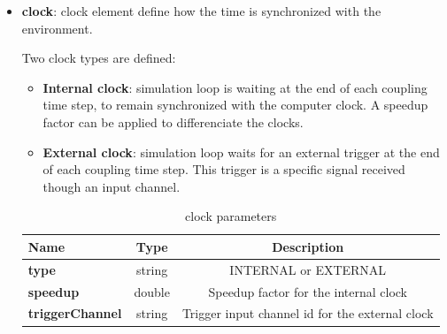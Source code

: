 \documentclass[a4paper, 12pt]{report}
\begin{document}
\begin{itemize}
\begin{itemize}
  \item \textbf{data}: type of data: CURVES, CONSTRAINTS, TIMELINE or LOGS
  \item \textbf{channel}: output channel to publish to, identified by its id.
  \item \textbf{format}: format for the output data, depending on the data type:
  \begin{itemize}
    \item for \textbf{CURVES}: JSON, CSV on the 'curves' topic, or BYTES which sends at the begining of the simulation the variables names separated by a newline character to topic "curves\_names, then periodically values as a vector of raw bytes to topic 'curves\_values'.
    \item for \textbf{CONSTRAINTS}: JSON, TXT or XML to topic 'constraints'
    \item for \textbf{TIMELINE}: JSON, CSV, TXT or XML to topic 'timeline'
  \end{itemize}

\end{itemize}

\item \textbf{clock}: clock element define how the time is synchronized with the environment.

Two clock types are defined:
\begin{itemize}
  \item \textbf{Internal clock}: simulation loop is waiting at the end of each coupling time step, to remain synchronized with the computer clock. A speedup factor can be applied to differenciate the clocks.
  \item \textbf{External clock}: simulation loop waits for an external trigger at the end of each coupling time step. This trigger is a specific signal received though an input channel.
\end{itemize}


\begin{table}[H]
\center
\begin{tabular}{ l | c | c }
\toprule
\textbf{{Name}} & \textbf{{Type}} & \textbf{{Description}} \\
\midrule
\rowcolor{white}
\textbf{type} & string & INTERNAL or EXTERNAL \\
\rowcolor{gray!10}
\textbf{speedup} & double & Speedup factor for the internal clock \\
\rowcolor{white}
\textbf{triggerChannel} & string & Trigger input channel id for the external clock \\
\bottomrule
\end{tabular}
\caption{clock parameters}
\end{table}


\end{itemize}
\end{document}

